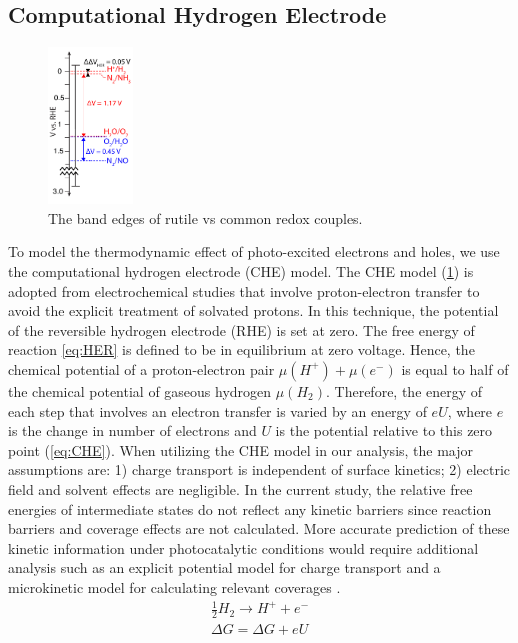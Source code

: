 \subsection{Computational Hydrogen Electrode} \label{CHE_method}
\begin{figure}[h]
\centering
\includegraphics[width=0.2\textwidth]{figures/proposal_figures/redox_ladder.pdf}
\caption{The band edges of rutile vs common redox couples.}
\label{fig:redox_ladder}
\end{figure}

To model the thermodynamic effect of photo-excited electrons and holes, we use the computational hydrogen electrode (CHE) model. The CHE model (\ref{fig:redox_ladder}) is adopted from electrochemical studies that involve proton-electron transfer \cite{Peterson_2010, Norskov_2004,Skulason_2012} to avoid the explicit treatment of solvated protons. In this technique, the potential of the reversible hydrogen electrode (RHE) is set at zero. The free energy of reaction \ref{eq:HER} is defined to be in equilibrium at zero voltage. Hence, the chemical potential of a proton-electron pair $\mu(H^+) + \mu(e^-)$ is equal to half of the chemical potential of gaseous hydrogen $\mu(H_2)$. Therefore, the energy of each step that involves an electron transfer is varied by an energy of $eU$, where $e$ is the change in number of electrons and $U$ is the potential relative to this zero point (\ref{eq:CHE}). When utilizing the CHE model in our analysis, the major assumptions are: 1) charge transport is independent of surface kinetics; 2) electric field and solvent effects are negligible. In the current study, the relative free energies of intermediate states do not reflect any kinetic barriers since reaction barriers and coverage effects are not calculated. More accurate prediction of these kinetic information under photocatalytic conditions would require additional analysis such as an explicit potential model for charge transport and a microkinetic model for calculating relevant coverages \cite{Peterson_2010}. 
\begin{align}
	\frac{1}{2}H_2 \rightarrow H^{+}+e^{-} \label{eq:HER} \\
	\Delta G = \Delta G +eU \label{eq:CHE}
\end{align} 

